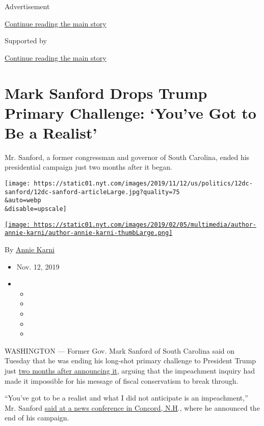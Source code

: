 Advertisement

\protect\hyperlink{after-top}{Continue reading the main story}

Supported by

\protect\hyperlink{after-sponsor}{Continue reading the main story}

\hypertarget{mark-sanford-drops-trump-primary-challenge-youve-got-to-be-a-realist}{%
\section{Mark Sanford Drops Trump Primary Challenge: `You've Got to Be a
Realist'}\label{mark-sanford-drops-trump-primary-challenge-youve-got-to-be-a-realist}}

Mr. Sanford, a former congressman and governor of South Carolina, ended
his presidential campaign just two months after it began.

\texttt{[image: https://static01.nyt.com/images/2019/11/12/us/politics/12dc-sanford/12dc-sanford-articleLarge.jpg?quality=75\\\&auto=webp\\\&disable=upscale]}

\href{https://www.nytimes.com/by/annie-karni}{\texttt{[image: https://static01.nyt.com/images/2019/02/05/multimedia/author-annie-karni/author-annie-karni-thumbLarge.png]}}

By \href{https://www.nytimes.com/by/annie-karni}{Annie Karni}

\begin{itemize}
\item
  Nov. 12, 2019
\item
  \begin{itemize}
  \item
  \item
  \item
  \item
  \item
  \end{itemize}
\end{itemize}

WASHINGTON --- Former Gov. Mark Sanford of South Carolina said on
Tuesday that he was ending his long-shot primary challenge to President
Trump just
\href{https://www.nytimes.com/2019/09/08/us/politics/mark-sanford-president.html}{two
months after announcing it}, arguing that the impeachment inquiry had
made it impossible for his message of fiscal conservatism to break
through.

``You've got to be a realist and what I did not anticipate is an
impeachment,'' Mr. Sanford
\href{https://www.postandcourier.com/politics/former-sc-gov-mark-sanford-has-dropped-out-of-presidential/article_3def9eee-0171-11ea-84ec-8bd313d6fd8a.html}{said
at a news conference in Concord, N.H}., where he announced the end of
his campaign.

